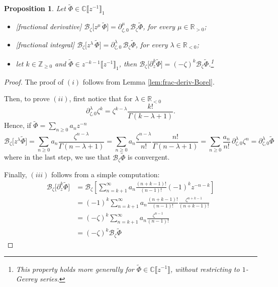 \documentclass{article}
\newcommand{\Z}{\mathbb{Z}}
\newcommand{\R}{\mathbb{R}}
\newcommand{\C}{\mathbb{C}}
\newcommand{\series}[1]{\tilde{#1}}
\newcommand{\fracderiv}[3]{\partial^{#1}_{#2, #3}}
\newcommand*{\defeq}{\mathrel{\vcenter{\baselineskip0.5ex \lineskiplimit0pt
                     \hbox{\scriptsize.}\hbox{\scriptsize.}}}%
                     =}
\newcommand{\borel}{\mathcal{B}}
\theoremstyle{definition}
\theoremstyle{plain}
\newtheorem{prop}[definition]{Proposition}
\begin{document}
\begin{prop}\label{prop:frac-der-int-borel}
Let $\series{\Phi}\in\C\llbracket z^{-1}\rrbracket_1$ %
\begin{itemize}
\item[(i)] \emph{[fractional derivative]} $\borel_\zeta\big[ z^\mu \, \series{\Phi}\big]=\fracderiv{\mu}{\zeta}{0}\, \borel_\zeta\series{\Phi}$, for every $\mu\in\R_{> 0}$;
\item[(ii)] \emph{[fractional integral]} $\borel_\zeta\big[z^\lambda\, \series{\Phi}\big]=\fracderiv{\lambda}{\zeta}{0}\,\borel_\zeta\series{\Phi}$, for every $\lambda\in\R_{<0}$; 
\item[(iii)] let $k\in\Z_{\ge 0}$ and $\series{\Phi}\in z^{-k-1}\llbracket z^{-1}\rrbracket_1$, then $\borel_\zeta\big[\partial_z^{k} \series{\Phi}\big]=(-\zeta)^k\borel_\zeta\series{\Phi}$.\footnote{This property holds more generally for $\series{\Phi}\in\C\llbracket z^{-1}\rrbracket$, without restricting to $1$-Gevrey series.}
\end{itemize} 
\end{prop}
\begin{proof} 
The proof of $(i)$ follows from Lemma \ref{lem:frac-deriv-Borel}. 

Then, to prove $(ii)$, first notice that for $\lambda\in\R_{< 0}$  
\[\fracderiv{\lambda}{\zeta}{0}\zeta^{k}=\zeta^{k-\lambda}\frac{k!}{\Gamma(k-\lambda+1)}.\] 
Hence, if $\series{\Phi}=\sum_{n\geq 0}a_n z^{-n}$ %
\[\borel_\zeta \big[z^\lambda \series{\Phi}\big]=\sum_{n\geq 0}a_n\frac{\zeta^{n-\lambda}}{\Gamma(n-\lambda+1)}=\sum_{n\geq 0}a_n\frac{\zeta^{n-\lambda}}{n!}\frac{n!}{\Gamma(n-\lambda+1)}=\sum_{n\geq 0} \frac{a_n}{n!}\,\fracderiv{\lambda}{\zeta}{0}\zeta^n=\fracderiv{\lambda}{\zeta}{0}\series{\Phi}\]
where in the last step, we use that $\borel_\zeta\series{\Phi}$ is convergent. 

Finally, $(iii)$ follows from a simple computation: 
\begin{align*}
\borel_\zeta\big[\partial_z^k\series{\Phi}\big]&=\borel_\zeta\left[\sum_{n=k+1}^\infty a_n \frac{(n+k-1)!}{(n-1)!} (-1)^{k} z^{-n-k}\right]\\
&=(-1)^k \sum_{n=k+1}^\infty a_n \frac{(n+k-1)!}{(n-1)!}\frac{\zeta^{n+k-1}}{(n+k-1)!}\\
&=(-\zeta)^k\sum_{n=k+1}^\infty a_n \frac{\zeta^{n-1}}{(n-1)!}\\
&=(-\zeta)^k\borel_\zeta \series{\Phi}
\end{align*}
\end{proof}
%
\end{document}
